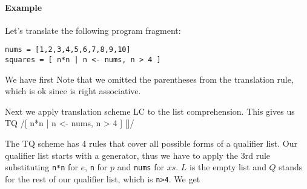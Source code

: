 
\paragraph{Example}
Let's translate the following program fragment:

\begin{verbatim}
nums = [1,2,3,4,5,6,7,8,9,10]
squares = [ n*n | n <- nums, n > 4 ]
\end{verbatim}

We have first 
Note that we omitted the parentheses from the translation rule, which is ok since \sym{:} is right associative.

Next we apply translation scheme LC to the list comprehension. This gives us\\
TQ \ex/[ n*n | n <- nums, n > 4 ] []/

The TQ scheme has 4 rules that cover all possible forms of a qualifier list. Our qualifier list starts with a generator, thus we have to apply the 3rd rule substituting \texttt{n*n} for $e$, \texttt{n} for $p$ and \texttt{nums} for $xs$. $L$ is the empty list and $Q$ stands for the rest of our qualifier list, which is \texttt{n>4}.
We get

